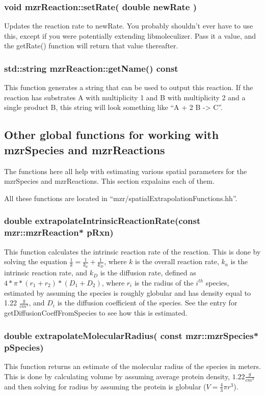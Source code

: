 \subsubsection{void mzrReaction::setRate( double newRate )}
Updates the reaction rate to newRate.  You probably shouldn't ever
have to use this, except if you were potentially extending
libmoleculizer.  Pass it a value, and the getRate() function will
return that value thereafter.  

\subsubsection{std::string mzrReaction::getName() const}
This function generates a string that can be used to output this
reaction.  If the reaction has substrates A with multiplicity 1 and B
with multiplicity 2 and a single product B, this string will look
something like ``A + 2 B -> C''.

\subsection{Other global functions for working with mzrSpecies and mzrReactions}
The functions here all help with estimating various spatial parameters
for the mzrSpecies and mzrReactions.  This section expalains each of
them.  

All these functions are located in ``mzr/spatialExtrapolationFunctions.hh''.

\subsubsection{double extrapolateIntrinsicReactionRate(const
  mzr::mzrReaction* pRxn)}

This function calculates the intrinsic reaction rate of the reaction.
This is done by solving the equation $\frac{1}{k} = \frac{1}{k_a} +
\frac{1}{k_D}$, where $k$ is the overall reaction rate, $k_a$ is the
intrinsic reaction rate, and $k_D$ is the diffusion rate, defined as
$4 * \pi * (r_1 + r_2) * (D_1 + D_2)$, where $r_i$ is the radius of
the $i^{th}$ species, estimated by assuming the species is roughly
globular and has density equal to 1.22 $\frac{g}{cm^3}$, and $D_i$ is
the diffusion coefficient of the species.  See the entry for
getDiffusionCoeffFromSpecies to see how this is estimated.
    
\subsubsection{double extrapolateMolecularRadius( const
  mzr::mzrSpecies* pSpecies)}
This function returns an estimate of the molecular radius of the
species in meters.  This is done by calculating volume by assuming
average protein density, $1.22 \frac{g}{cm^3}$ and then solving for
radius by assuming the protein is globular ($V = \frac{4}{3}\pi r^3$).

